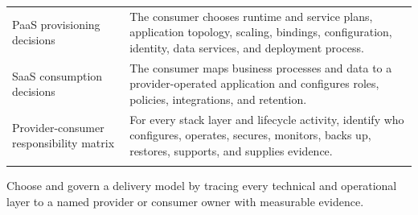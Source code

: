 \documentclass[11pt]{article}
\begin{document}
\begin{longtable}{@{}>{\RaggedRight\arraybackslash}p{}>{\RaggedRight\arraybackslash}p{}@{}}
PaaS provisioning decisions & The consumer chooses runtime and service plans, application topology, scaling, bindings, configuration, identity, data services, and deployment process. \\\addlinespace[2pt]
SaaS consumption decisions & The consumer maps business processes and data to a provider-operated application and configures roles, policies, integrations, and retention. \\\addlinespace[2pt]
Provider-consumer responsibility matrix & For every stack layer and lifecycle activity, identify who configures, operates, secures, monitors, backs up, restores, supports, and supplies evidence. \\\addlinespace[2pt]
\bottomrule
\end{longtable}
\begin{takeawaybox}
Choose and govern a delivery model by tracing every technical and operational layer to a named provider or consumer owner with measurable evidence.
\end{takeawaybox}
\end{document}
